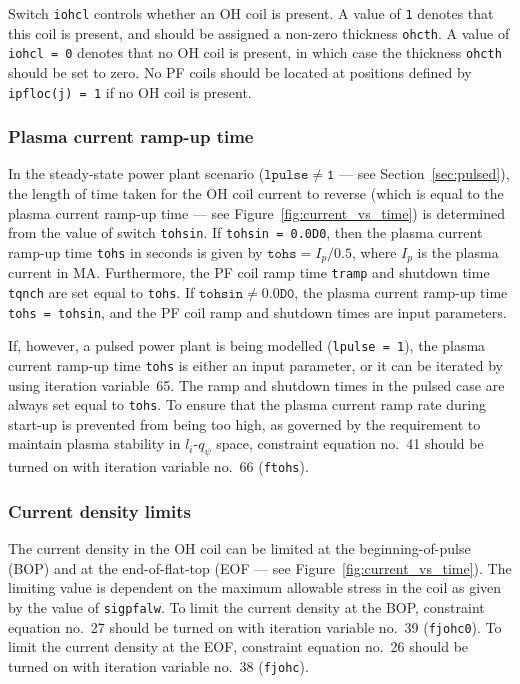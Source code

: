 \documentclass[11pt,a4paper]{report}
\begin{document}
Switch \texttt{iohcl} controls whether an OH coil is present. A value of
\texttt{1} denotes that this coil is present, and should be assigned a
non-zero thickness \texttt{ohcth}. A value of \texttt{iohcl = 0} denotes that
no OH coil is present, in which case the thickness \texttt{ohcth} should be
set to zero. No PF coils should be located at positions defined by
\texttt{ipfloc(j) = 1} if no OH coil is present.

\subsubsection{Plasma current ramp-up time}
\label{sec:tohs}

In the steady-state power plant scenario ($\mathtt{lpulse \not= 1}$ --- see
Section~\ref{sec:pulsed}), the length of time taken for the OH coil current to
reverse (which is equal to the plasma current ramp-up time --- see
Figure~\ref{fig:current_vs_time}) is determined from the value of switch
\texttt{tohsin}. If \texttt{tohsin = 0.0D0}, then the plasma current ramp-up
time \texttt{tohs} in seconds is given by $\mathtt{tohs} = I_p / 0.5$, where
$I_p$ is the plasma current in MA\@. Furthermore, the PF coil ramp time
\texttt{tramp} and shutdown time \texttt{tqnch} are set equal to
\texttt{tohs}.  If $\mathtt{tohsin \not= 0.0D0}$, the plasma current ramp-up
time \texttt{tohs = tohsin}, and the PF coil ramp and shutdown times are input
parameters.

If, however, a pulsed power plant is being modelled (\texttt{lpulse = 1}), the
plasma current ramp-up time \texttt{tohs} is either an input parameter, or it can be
iterated by using iteration variable~65. The ramp and shutdown times in the
pulsed case are always set equal to \texttt{tohs}. To ensure that the plasma
current ramp rate during start-up is prevented from being too high, as
governed by the requirement to maintain plasma stability in $l_i$-$q_\psi$
space, constraint equation no.\ 41 should be turned on with iteration variable
no.\ 66 (\texttt{ftohs}).

\subsubsection{Current density limits}

The current density in the OH coil can be limited at the beginning-of-pulse
(BOP) and at the end-of-flat-top (EOF --- see
Figure~\ref{fig:current_vs_time}). The limiting value is dependent on the
maximum allowable stress in the coil as given by the value of
\texttt{sigpfalw}. To limit the current density at the BOP, constraint
equation no.\ 27 should be turned on with iteration variable no.\ 39
(\texttt{fjohc0}). To limit the current density at the EOF, constraint
equation no.\ 26 should be turned on with iteration variable no.\ 38
(\texttt{fjohc}).
\end{document}
